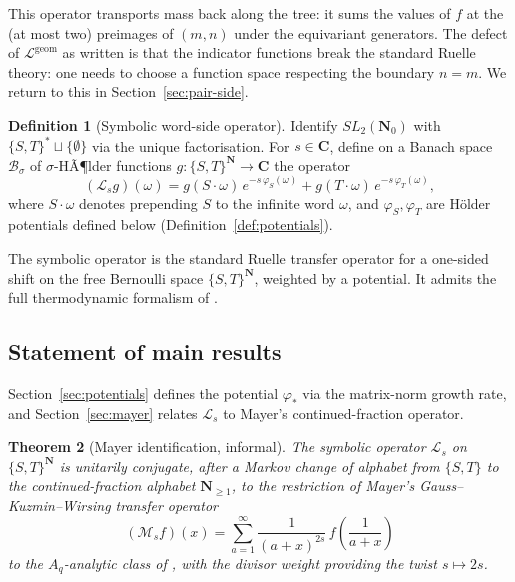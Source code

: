 ﻿\documentclass[11pt]{article}
\newtheorem{theorem}{Theorem}[section]
\theoremstyle{definition}
\newtheorem{definition}[theorem]{Definition}
\newcommand{\N}{\mathbf{N}}
\newcommand{\Nz}{\mathbf{N}_0}
\newcommand{\C}{\mathbf{C}}
\newcommand{\SLNz}{SL_2(\Nz)}
\newcommand{\Lop}{\mathcal{L}}
\begin{document}
This operator transports mass back along the tree: it sums the values of $f$ at the (at most two) preimages of $(m,n)$ under the equivariant generators. The defect of $\Lop^{\mathrm{geom}}$ as written is that the indicator functions break the standard Ruelle theory: one needs to choose a function space respecting the boundary $n=m$. We return to this in Section~\ref{sec:pair-side}.

\begin{definition}[Symbolic word-side operator]\label{def:Lsymbolic}
Identify $\SLNz$ with $\{S,T\}^*\sqcup\{\emptyset\}$ via the unique factorisation. For $s\in\C$, define on a Banach space $\mathcal{B}_\sigma$ of $\sigma$-HÃ¶lder functions $g:\{S,T\}^\N\to\C$ the operator
\begin{equation}\label{eq:Lsymbolic}
(\Lop_s g)(\omega) = g(S\cdot\omega)\,e^{-s\,\varphi_S(\omega)} + g(T\cdot\omega)\,e^{-s\,\varphi_T(\omega)},
\end{equation}
where $S\cdot\omega$ denotes prepending $S$ to the infinite word $\omega$, and $\varphi_S,\varphi_T$ are H\"older potentials defined below (Definition~\ref{def:potentials}).
\end{definition}

The symbolic operator is the standard Ruelle transfer operator for a one-sided shift on the free Bernoulli space $\{S,T\}^\N$, weighted by a potential. It admits the full thermodynamic formalism of \cite{ruelle,parry-pollicott}.

\subsection{Statement of main results}

Section~\ref{sec:potentials} defines the potential $\varphi_*$ via the matrix-norm growth rate, and Section~\ref{sec:mayer} relates $\Lop_s$ to Mayer's continued-fraction operator.

\begin{theorem}[Mayer identification, informal]\label{thm:identification-informal}
The symbolic operator $\Lop_s$ on $\{S,T\}^\N$ is unitarily conjugate, after a Markov change of alphabet from $\{S,T\}$ to the continued-fraction alphabet $\N_{\ge 1}$, to the restriction of Mayer's Gauss--Kuzmin--Wirsing transfer operator
\[
(\mathcal{M}_s f)(x) = \sum_{a=1}^\infty \frac{1}{(a+x)^{2s}}\,f\!\left(\frac{1}{a+x}\right)
\]
to the $A_q$-analytic class of \cite{mayer}, with the divisor weight providing the twist $s\mapsto 2s$.
\end{theorem}
\end{document}

